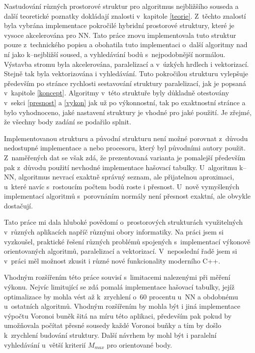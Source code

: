 Nastudování různých prostorové struktur pro algoritmus nejbližšího souseda a další teoretické poznatky dokládají znalosti v~kapitole \ref{teorie}. Z~těchto znalostí byla vybrána implementace pokročilé hybridní prostorové struktury, které je vysoce akcelerována pro NN. Tato práce znovu implementovala tuto struktur pouze z~technického popisu a obohatila tuto implementaci o~další algoritmy nad ní jako k--nejbližší soused, a vyhledávání bodů s~nejpodobnější normálou. Výstavba stromu byla akcelerována, paralelizací a v~úzkých hrdlech i vektorizací. Stejně tak byla vektorizována i vyhledávání. Tuto pokročilou strukturu vylepšuje především po stránce rychlosti sestavování struktury paralelizací, jak je popsaná v~kapitole \ref{koncept}. Algoritmy v~této struktuře byly důkladně otestovány v~sekci \ref{presnost} a \ref{vykon} jak už po výkonnostní, tak po exaktnostní stránce a bylo vyhodnoceno, jaké nastavení struktury je vhodné pro jaké použití. Je zřejmé, že všechny body zadání se podařilo splnit.

Implementovanou strukturu a původní strukturu není možné porovnat z~důvodu nedostupné implementace a nebo procesoru, který byl původními autory použit. Z~naměřených dat se však zdá, že prezentovaná varianta je pomalejší především pak z~důvodu použití nevhodné implementace hašovací tabulky. U~algoritmu k--NN, algoritmus nevrací exaktně správný seznam, ale přijatelnou aproximaci, u~které navíc s~rostoucím počtem bodů roste i přesnost. U~nově vymyšlených implementací algoritmů s~porovnáním normály není přesnost exaktní, ale obvykle dostačují. 

Tato práce mi dala hluboké povědomí o~prostorových strukturách využitelných v~různých aplikacích napříč různými obory informatiky. Na práci jsem si vyzkoušel, praktické řešení různých problémů spojených s~implementací výkonově orientovaných algoritmů, paralelizací a vektorizací. V~neposlední řadě jsem si v~práci měl možnost zkusit i různé nové funkcionality moderního C++.

Vhodným rozšířením této práce souvisí s~limitacemi nalezenými při měření výkonu. Nejvíc limitující se zdá pomalá implementace hašovací tabulky, jejíž optimalizace by mohla vést až k~zrychlení o~60 procentu u~NN a obdobnému u~ostatních algoritmů. Vhodným rozšířením by mohla být i jiná implementace výpočtu Voronoi buněk šitá na míru této aplikaci, především pak pokud by umožňovala počítat přesné sousedy každé Voronoi buňky a tím by došlo k~zrychlení budování struktury. Další návrhem by mohl být i paralelní vyhledávání u~větší kriterií $M_{max}$ pro orientované body. 

\let\clearpage\relax